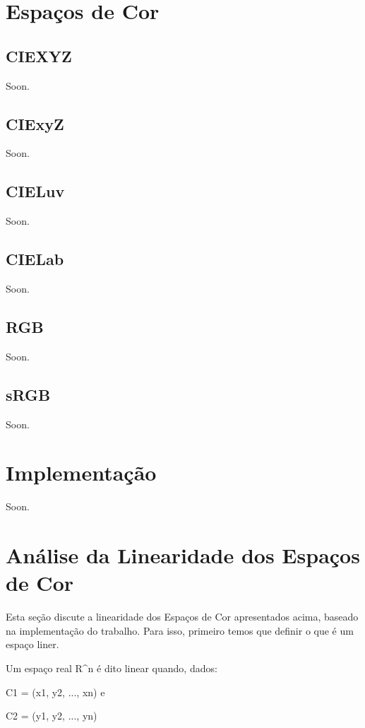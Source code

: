 \documentclass[a4paper,10pt]{report}
\begin{document}
\section{Espaços de Cor}

\subsection{CIEXYZ}
Soon.

\subsection{CIExyZ}
Soon.

\subsection{CIELuv}
Soon.

\subsection{CIELab}
Soon.

\subsection{RGB}
Soon.

\subsection{sRGB}
Soon.

\section{Implementação}
Soon.

\section{Análise da Linearidade dos Espaços de Cor}
\par
Esta seção discute a linearidade dos Espaços de Cor apresentados acima, baseado
na implementação do trabalho. Para isso, primeiro temos que definir o que é um
espaço liner.
\par
Um espaço real R^n é dito linear quando, dados:

\begin{list}
\item C1 = (x1, y2, ..., xn) e
\item C2 = (y1, y2, ..., yn)
\end{list}
\end{document}
